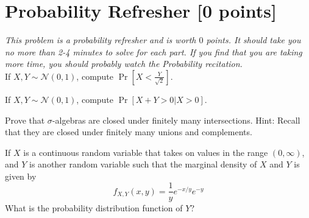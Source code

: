 \newpage

\section{Probability Refresher [0 points]}

 \emph{This problem is a probability refresher and is worth $0$ points. It should take you no more than 2-4 minutes to solve for each part. If you find that you are taking more time, you should probably watch the Probability recitation.}\\

\problem[0] If $X, Y \sim \mathcal{N}(0, 1)$, compute $\Pr[X < \frac{Y}{\sqrt{2}}]$.\\


\begin{solution}
\end{solution}

\vspace{0.5cm}

\problem[0] If $X, Y \sim \mathcal{N}(0, 1)$, compute $\Pr[X+Y>0 | X>0]$. \\

\begin{solution}
\end{solution}

\vspace{0.5cm}

\problem[0] Prove that $\sigma$-algebras are closed under finitely many intersections. Hint: Recall that they are closed under finitely many unions and complements.\\

\begin{solution}
\qedhere
\end{solution}

\vspace{0.5cm}

\problem[0] If $X$ is a continuous random variable that takes on values in the range $(0,\infty)$, and $Y$ is another random variable such that the marginal density of $X$ and $Y$ is given by
\[f_{X,Y}(x,y) = \frac{1}{y} e^{-x/y}e^{-y}\]
What is the probability distribution function of $Y$? \\

\begin{solution}
\end{solution}

\newpage


